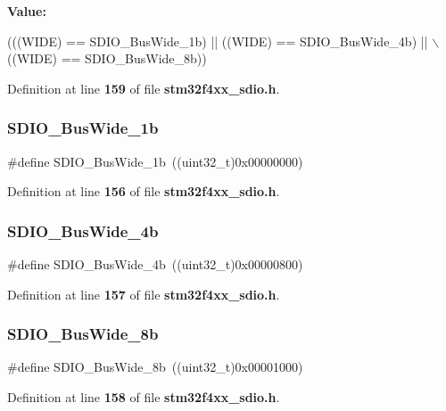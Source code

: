 {\bfseries Value\+:}
\begin{DoxyCode}
(((WIDE) == SDIO_BusWide_1b) || ((WIDE) == SDIO_BusWide_4b) || \(\backslash\)
                                ((WIDE) == SDIO_BusWide_8b))
\end{DoxyCode}


Definition at line \textbf{ 159} of file \textbf{ stm32f4xx\+\_\+sdio.\+h}.

\mbox{\label{group__SDIO__Bus__Wide_ga9c333b57937c5cc0a173a58519f9250a}} 
\subsubsection{S\+D\+I\+O\+\_\+\+Bus\+Wide\+\_\+1b}
{\footnotesize\ttfamily \#define S\+D\+I\+O\+\_\+\+Bus\+Wide\+\_\+1b~((uint32\+\_\+t)0x00000000)}



Definition at line \textbf{ 156} of file \textbf{ stm32f4xx\+\_\+sdio.\+h}.

\mbox{\label{group__SDIO__Bus__Wide_ga79815d1d798b28a2d3750ad25466ff1b}} 
\subsubsection{S\+D\+I\+O\+\_\+\+Bus\+Wide\+\_\+4b}
{\footnotesize\ttfamily \#define S\+D\+I\+O\+\_\+\+Bus\+Wide\+\_\+4b~((uint32\+\_\+t)0x00000800)}



Definition at line \textbf{ 157} of file \textbf{ stm32f4xx\+\_\+sdio.\+h}.

\mbox{\label{group__SDIO__Bus__Wide_ga4d864f5c4e1af298146afc1d680081e9}} 
\subsubsection{S\+D\+I\+O\+\_\+\+Bus\+Wide\+\_\+8b}
{\footnotesize\ttfamily \#define S\+D\+I\+O\+\_\+\+Bus\+Wide\+\_\+8b~((uint32\+\_\+t)0x00001000)}



Definition at line \textbf{ 158} of file \textbf{ stm32f4xx\+\_\+sdio.\+h}.

